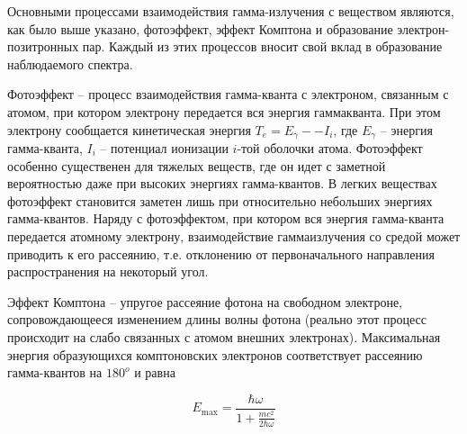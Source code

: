 Основными процессами взаимодействия гамма-излучения с веществом являются, как
было выше указано, фотоэффект, эффект Комптона и образование
электрон-позитронных пар. Каждый из этих процессов вносит свой вклад в
образование наблюдаемого спектра.

Фотоэффект -- процесс взаимодействия гамма-кванта с электроном, связанным с
атомом, при котором электрону передается вся энергия гаммакванта. При этом
электрону сообщается кинетическая энергия $T_e = E_{\gamma} -- I_i$, где
$E_{\gamma}$ -- энергия гамма-кванта, $I_i$ -- потенциал ионизации $i$-той
оболочки атома. Фотоэффект особенно существенен для тяжелых веществ, где он идет
с заметной вероятностью даже при высоких энергиях гамма-квантов. В легких
веществах фотоэффект становится заметен лишь при относительно небольших энергиях
гамма-квантов. Наряду с фотоэффектом, при котором вся энергия гамма-кванта
передается атомному электрону, взаимодействие гаммаизлучения со средой может
приводить к его рассеянию, т.е. отклонению от первоначального направления
распространения на некоторый угол.

Эффект Комптона -- упругое рассеяние фотона на свободном электроне,
сопровождающееся изменением длины волны фотона (реально этот процесс происходит
на слабо связанных с атомом внешних электронах). Максимальная энергия
образующихся комптоновских электронов соответствует рассеянию гамма-квантов на
$180^o$ и равна

\begin{equation}\label{eq::Ehw}
  E_{\max} = \frac{\hbar  \omega}{1 + \frac{m c^2}{2 \hbar \omega}}
\end{equation}
